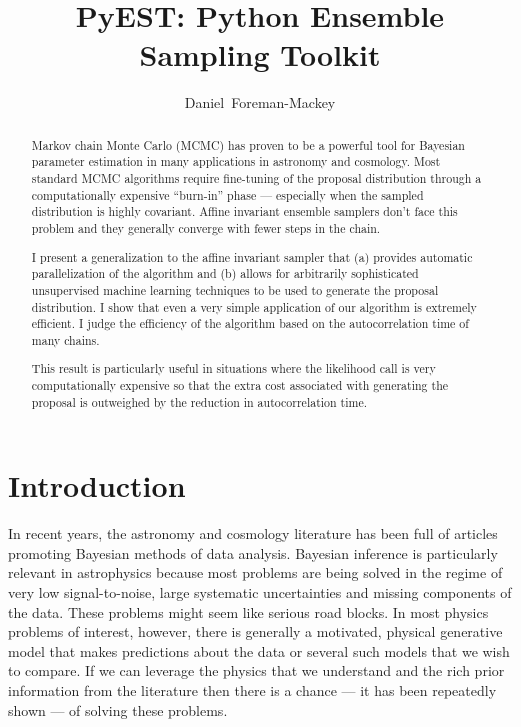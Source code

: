 \documentclass[12pt,preprint]{aastex}
\begin{document}
\title{PyEST: Python Ensemble Sampling Toolkit}
\author{Daniel~Foreman-Mackey}

\begin{abstract}

    Markov chain Monte Carlo (MCMC) has proven to be a powerful tool for Bayesian
    parameter estimation in many applications in astronomy and cosmology.  Most
    standard MCMC algorithms require fine-tuning of the proposal distribution
    through a computationally expensive ``burn-in'' phase --- especially when the
    sampled distribution is highly covariant.
    Affine invariant ensemble samplers don't face this problem and they generally
    converge with fewer steps in the chain.

    I present a generalization to the \citet{Goodman:2010} affine invariant sampler
    that (a) provides automatic parallelization of the algorithm and (b) allows
    for arbitrarily sophisticated unsupervised machine learning techniques
    to be used to generate the proposal distribution.  I show that even a very simple
    application of our algorithm is extremely efficient.  I judge the efficiency
    of the algorithm based on the autocorrelation time of many chains.

    This result is particularly useful in situations where the likelihood call is
    very computationally expensive so that the extra cost associated with generating
    the proposal is outweighed by the reduction in autocorrelation time.

\end{abstract}


\section{Introduction}

In recent years, the astronomy and cosmology literature has been full of articles
promoting Bayesian methods of data analysis. Bayesian inference is particularly
relevant in astrophysics because most problems are being solved in the regime of
very low signal-to-noise, large systematic uncertainties and missing components of
the data. These problems might seem like serious road blocks. In most physics problems
of interest, however, there is generally a motivated, physical generative model
that makes predictions about the data or several such models that we wish to compare.
If we can leverage the physics that we understand and the rich prior information
from the literature then there is a chance --- it has been repeatedly shown ---
of solving these problems.
\end{document}
